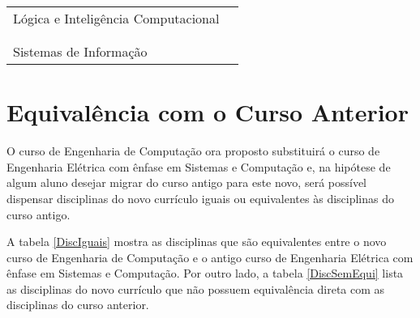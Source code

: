 \begin{table}[ht]
\begin{tabularx}{\textwidth}{ X  l }
		                                                        \hline	
		\multirow{3}{*}{Lógica e Inteligência Computacional}    & \IC               \\ %
		                                                        & \ICII              \\ %
		                                                        & \LogProg          \\ %
																& \MineraDados      \\ %
		                                                        & \ProcImag         \\ %
		                                                        \hline													
		\multirow{4}{*}{Sistemas de Informação}                 & \EngSistC         \\ %
																& \EngSistA		 \\  %
		                                                        & \ProjBD           \\
		                                                        & \EngCompSoc       \\
		                                                        \hline
	\end{tabularx}
\end{table}




\section{Equivalência com o Curso Anterior}
O curso de Engenharia de Computação ora proposto substituirá o curso de Engenharia Elétrica com ênfase em Sistemas e Computação e, na hipótese de algum aluno desejar migrar do curso antigo para este novo, será possível dispensar disciplinas do novo currículo iguais ou equivalentes às disciplinas do curso antigo.

A tabela \ref{DiscIguais} mostra as disciplinas que são equivalentes entre o novo curso de Engenharia de Computação e o antigo curso de Engenharia Elétrica com ênfase em Sistemas e Computação. Por outro lado, a tabela \ref{DiscSemEqui} lista as disciplinas do novo currículo que não possuem equivalência direta com as disciplinas do curso anterior.

